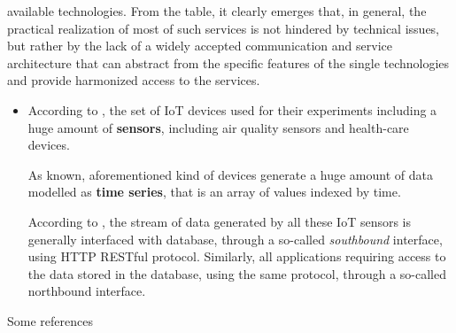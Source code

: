 \documentclass[10pt]{beamer}
\begin{document}
\begin{frame}{}







available technologies. From the table, it clearly
emerges that, in general, the practical realization of most
of such services is not hindered by technical issues, but rather
by the lack of a widely accepted communication and service
architecture that can abstract from the speciﬁc features of the
single technologies and provide harmonized access to the
services.

\begin{itemize}
\item According to \citet{ITPAReport}, the set of IoT devices used for their experiments including a huge amount of \textbf{sensors}, including air quality sensors and health-care devices. 

As known, aforementioned kind of devices generate a huge amount of data modelled as \textbf{time series}, that is an array of values indexed by time. 

According to \citet{TIMESERIES}, the stream of data generated by all these IoT sensors is generally interfaced with database, through a so-called \textit{southbound} interface, using HTTP RESTful protocol. Similarly, all applications requiring access to the data stored in the database, using the same protocol, through a so-called northbound interface. 

\end{itemize}
\end{frame} 









\begin{frame}[noframenumbering,shrink=15]{Some references}
\printbibliography
\end{frame}
\end{document}
